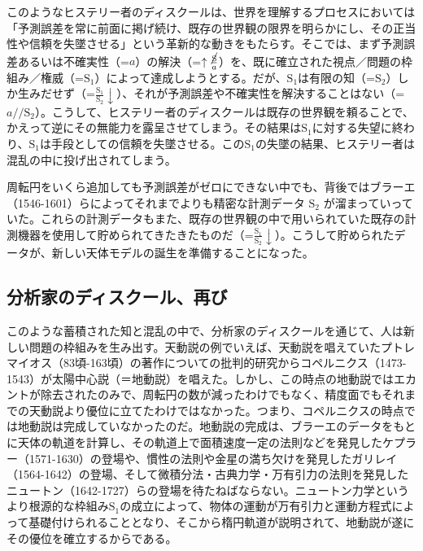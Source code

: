 このような\mbox{ヒステリー者のディスクール}は、世界を理解するプロセスにおいては「\mbox{予測誤差}を常に前面に掲げ続け、既存の世界観の限界を明らかにし、その正当性や信頼を失墜させる」という革新的な動きをもたらす。そこでは、まず\mbox{予測誤差}あるいは不確実性（=\(a\)）の解決（=\(\uparrow\frac{\cancel{\textrm{S}}}{a}\)）を、既に確立された視点／問題の枠組み／権威（=\(\textrm{S}_1\)）によって達成しようとする。だが、\(\textrm{S}_1\)は有限の知（=\(\textrm{S}_2\)）しか生みだせず（=\(\frac{\textrm{S}_1}{\textrm{S}_2}\downarrow\)）、それが\mbox{予測誤差}や不確実性を解決することはない（=\(a//\textrm{S}_2\)）。こうして、\mbox{ヒステリー者のディスクール}は既存の世界観を頼ることで、かえって逆にその無能力を露呈させてしまう。その結果は\(\textrm{S}_1\)に対する失望に終わり、\(\textrm{S}_1\)は手段としての信頼を失墜させる。この\(\textrm{S}_1\)の失墜の結果、ヒステリー者は混乱の中に投げ出されてしまう。

周転円をいくら追加しても\mbox{予測誤差}がゼロにできない中でも、背後ではブラーエ（1546-1601）らによってそれまでよりも精密な計測データ
\(\textrm{S}_2\)
が溜まっていっていた。これらの計測データもまた、既存の世界観の中で用いられていた既存の計測機器を使用して貯められてきたきたものだ（=\(\frac{\textrm{S}_1}{\textrm{S}_2}\downarrow\)）。こうして貯められたデータが、新しい天体モデルの誕生を準備することになった。

\subsection{分析家のディスクール、再び}\label{ux5206ux6790ux5bb6ux306eux30c7ux30a3ux30b9ux30afux30fcux30ebux518dux3073}

このような蓄積された知と混乱の中で、\mbox{分析家のディスクール}を通じて、人は新しい問題の枠組みを生み出す。天動説の例でいえば、天動説を唱えていたプトレマイオス（83頃-163頃）の著作についての批判的研究からコペルニクス（1473-1543）が太陽中心説（＝地動説）を唱えた。しかし、この時点の地動説ではエカントが除去されたのみで、周転円の数が減ったわけでもなく、精度面でもそれまでの天動説より優位に立てたわけではなかった。つまり、コペルニクスの時点では地動説は完成していなかったのだ。地動説の完成は、ブラーエのデータをもとに天体の軌道を計算し、その軌道上で面積速度一定の法則などを発見したケプラー（1571-1630）の登場や、慣性の法則や金星の満ち欠けを発見したガリレイ（1564-1642）の登場、そして微積分法・古典力学・万有引力の法則を発見したニュートン（1642-1727）らの登場を待たねばならない。ニュートン力学というより根源的な枠組み\(\textrm{S}_1\)の成立によって、物体の運動が万有引力と運動方程式によって基礎付けられることとなり、そこから楕円軌道が説明されて、地動説が遂にその優位を確立するからである。

